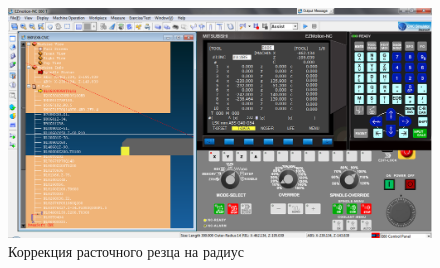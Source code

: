 \begin{figure}[ht]
\centering
	\includegraphics[scale=0.45]{7.png}
    \caption{Коррекция расточного резца на радиус\label{fig:radius}}
\end{figure}
\clearpage
